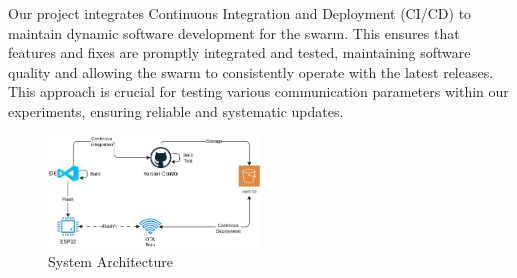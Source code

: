 \documentclass[conference]{IEEEtran}
\begin{document}
Our project integrates Continuous Integration and Deployment (CI/CD) to maintain dynamic software development for the swarm. This ensures that features and fixes are promptly integrated and tested, maintaining software quality and allowing the swarm to consistently operate with the latest releases. This approach is crucial for testing various communication parameters within our experiments, ensuring reliable and systematic updates.

\begin{figure}[h]
    \centering
    \includegraphics[width=0.5\textwidth]{architecture.png}
    \caption{System Architecture}
    \label{fig:architecture}
\end{figure}
\end{document}
